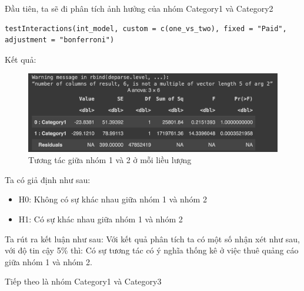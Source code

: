 \begin{itemize}
\begin{itemize}
\begin{itemize}
        Đầu tiên, ta sẽ đi phân tích ảnh hưởng của nhóm Category1 và Category2
        \begin{lstlisting}
testInteractions(int_model, custom = c(one_vs_two), fixed = "Paid", adjustment = "bonferroni")
        \end{lstlisting}
        Kết quả:
        \begin{figure}[H]
            \centering
            \includegraphics[width=0.8\linewidth]{part23_figures/11.png}
            \caption{Tương tác giữa nhóm 1 và 2 ở mỗi liều lượng}
            \label{Tương tác giữa nhóm 1 và 2 ở mỗi liều lượng}
        \end{figure}
        Ta có giả định như sau:
        \begin{itemize}
            \item H0: Không có sự khác nhau giữa nhóm 1 và nhóm 2
            \item H1: Có sự khác nhau giữa nhóm 1 và nhóm 2
        \end{itemize}
        Ta rút ra kết luận như sau: Với kết quả phân tích ta có một số nhận xét như sau, với độ tin cậy 5\% thì: Có sự tương tác có ý nghĩa thống kê ở việc thuê quảng cáo giữa nhóm 1 và nhóm 2.

        
        Tiếp theo là nhóm Category1 và Category3
        

\end{itemize}
\end{itemize}
\end{itemize}
